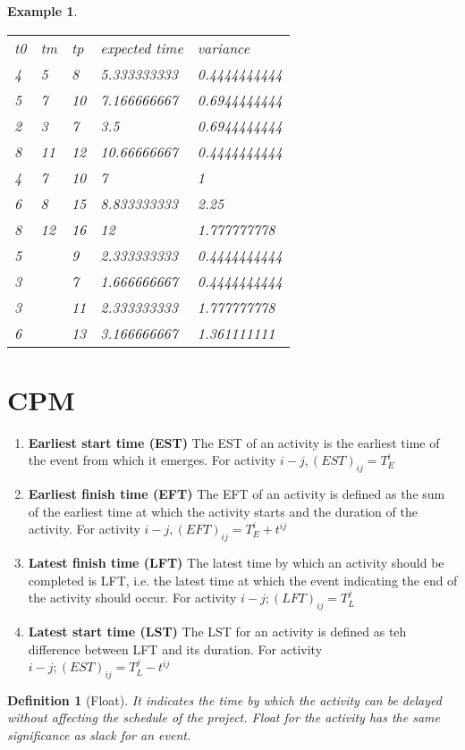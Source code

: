\documentclass[oneside,11pt,pdftex]{book}%
\numberwithin{equation}{section}
\newtheorem{example}[theorem]{Example}
\newtheorem{definition}[theorem]{Definition}
\numberwithin{section}{chapter}
\numberwithin{equation}{chapter}
\begin{document}
\begin{example}
	\begin{table}[]
		\centering
		\begin{tabular}{lllll}
			t0 & tm & tp & expected time & variance \\
			4 & 5 & 8 & 5.333333333 & 0.4444444444 \\
			5 & 7 & 10 & 7.166666667 & 0.6944444444 \\
			2 & 3 & 7 & 3.5 & 0.6944444444 \\
			8 & 11 & 12 & 10.66666667 & 0.4444444444 \\
			4 & 7 & 10 & 7 & 1 \\
			6 & 8 & 15 & 8.833333333 & 2.25 \\
			8 & 12 & 16 & 12 & 1.777777778 \\
			5 &  & 9 & 2.333333333 & 0.4444444444 \\
			3 &  & 7 & 1.666666667 & 0.4444444444 \\
			3 &  & 11 & 2.333333333 & 1.777777778 \\
			6 &  & 13 & 3.166666667 & 1.361111111
		\end{tabular}
	\end{table}
\end{example}

\section{CPM}
\begin{enumerate}
	\item \textbf{Earliest start time (EST)} The EST of an activity is the earliest time of the event from which it emerges. For activity $ i-j, (EST)_{ij}=T_E^i$
	\item \textbf{Earliest finish time (EFT)} The EFT of an activity is defined as the sum of the earliest time at which the activity starts and the duration of the activity. For activity $ i-j, (EFT)_{ij}=T_E^i+t^{ij} $
	\item \textbf{Latest finish time (LFT)} The latest time by which an activity should be completed is LFT, i.e. the latest time at which the event indicating the end of the activity should occur. For activity $ i-j; (LFT)_{ij}=T_L^j$
	\item \textbf{Latest start time (LST)}
	The LST for an activity is defined as teh difference between LFT and its duration. For activity $ i-j; (EST)_{ij}=T_L^j-t^{ij}$
\end{enumerate}
\begin{definition}[Float]
	It indicates the time by which the activity can be delayed without affecting the schedule of the project. Float for the activity has the same significance as slack for an event.
\end{definition}
\end{document}
